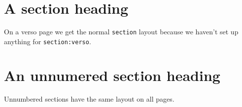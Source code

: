 \documentclass[a4paper,twoside]{article}
\begin{document}
\kant[1][3-4]

\newpage 
\section{A section heading} 

On a verso page we get the normal \texttt{section} layout because we
haven't set up anything for \texttt{section:verso}.

\kant[2][1-2]

\section*{An unnumered section heading} 

Unnumbered sections have the same layout on all pages.

\kant[1][3-4]
\end{document}
